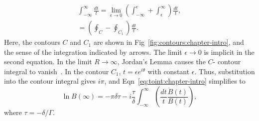 \begin{eqnarray}
\int^\infty_{-\infty} \frac{dt}{t} = \lim_{\epsilon \to 0} \left( \int^\epsilon_{-\infty} + \int_\epsilon^\infty \right) \frac{dt}{t}, \nonumber \\
  = \left(\oint_C - \oint_{C_1}\right) \frac{dt}{t}.
\label{eq:int1:chapter-intro}
\end{eqnarray}
Here, the contours $C$ and $C_1$ are shown in Fig~\ref{fig:contours:chapter-intro}, and the sense of the integration indicated by arrows. The limit $\epsilon \rightarrow 0$ is implicit in the second equation. In the limit $R \rightarrow \infty$, Jordan's Lemma causes the $C$- contour integral to vanish~\cite{arfken}. In the contour $C_1$, $t=\epsilon e^{i\theta}$ with constant $\epsilon$. Thus, substitution into the contour integral gives $i\pi$, and Eqn~\ref{eq:toint:chapter-intro} simplifies to
\begin{equation}
\ln B(\infty) = - \pi \delta \tau - i \frac{\tau}{\delta}\int^\infty_{-\infty} \left( \frac{dt}{t} \frac{\ddot{B}(t)}{B(t)}\right),
\label{eq:eqn4lnB:chapter-intro}
\end{equation}
where $\tau=-\delta/\Gamma$. 

